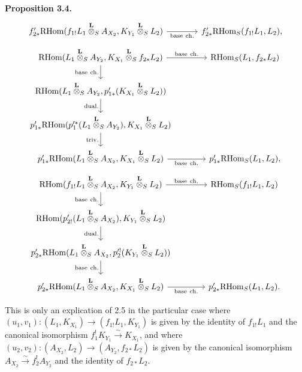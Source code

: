 \documentclass[11pt]{article}
\newenvironment{statement}[1]{\par\medskip\noindent\textbf{#1.}\ }{\par\medskip}
\providecommand{\RHom}{\mathrm{RHom}}
\begin{document}
\begin{statement}{Proposition 3.4}
\[\begin{tikzcd}[column sep=3.7em,row sep=1.7em]
f'_{2*}\RHom(f_{1!}L_1\overset{\mathbf L}{\otimes}_S A_{X_2},K_{Y_1}\overset{\mathbf L}{\otimes}_S L_2) \arrow[r,"\mathrm{base\ ch.}"']
& f'_{2*}\RHom_S(f_{1!}L_1,L_2),
\end{tikzcd}
\]
\[
\begin{tikzcd}[column sep=3.7em,row sep=1.7em]
\RHom(L_1\overset{\mathbf L}{\otimes}_S A_{Y_2},K_{X_1}\overset{\mathbf L}{\otimes}_S f_{2*}L_2)
  \arrow[r,"\mathrm{base\ ch.}"] \arrow[d,"\mathrm{base\ ch.}"']
& \RHom_S(L_1,f_{2*}L_2)  \\
\RHom(L_1\overset{\mathbf L}{\otimes}_S A_{Y_2},p'_{1*}(K_{X_1}\overset{\mathbf L}{\otimes}_S L_2)) \arrow[d,"\mathrm{dual.}"']
& \\
p'_{1*}\RHom(p_1'^*(L_1\overset{\mathbf L}{\otimes}_S A_{Y_2}),K_{X_1}\overset{\mathbf L}{\otimes}_S L_2) \arrow[d,"\mathrm{triv.}"']
& \\
p'_{1*}\RHom(L_1\overset{\mathbf L}{\otimes}_S A_{X_2},K_{X_1}\overset{\mathbf L}{\otimes}_S L_2) \arrow[r,"\mathrm{base\ ch.}"']
& p'_{1*}\RHom_S(L_1,L_2),
\end{tikzcd}
\]
\[
\begin{tikzcd}[column sep=3.7em,row sep=1.7em]
\RHom(f_{1!}L_1\overset{\mathbf L}{\otimes}_S A_{X_2},K_{Y_1}\overset{\mathbf L}{\otimes}_S L_2)
  \arrow[r,"\mathrm{base\ ch.}"] \arrow[d,"\mathrm{base\ ch.}"']
& \RHom_S(f_{1!}L_1,L_2)  \\
\RHom(p'_{2!}(L_1\overset{\mathbf L}{\otimes}_S A_{X_2}),K_{Y_1}\overset{\mathbf L}{\otimes}_S L_2) \arrow[d,"\mathrm{dual.}"']
& \\
p'_{2*}\RHom(L_1\overset{\mathbf L}{\otimes}_S A_{X_2},p_2'^!(K_{Y_1}\overset{\mathbf L}{\otimes}_S L_2)) \arrow[d,"\mathrm{base\ ch.}"']
& \\
p'_{2*}\RHom(L_1\overset{\mathbf L}{\otimes}_S A_{X_2},K_{X_1}\overset{\mathbf L}{\otimes}_S L_2) \arrow[r,"\mathrm{base\ ch.}"']
& p'_{2*}\RHom_S(L_1,L_2).
\end{tikzcd}
\]
\end{statement}
This is only an explication of 2.5 in the particular case where $(u_1,v_1):(L_1,K_{X_1})\to(f_{1!}L_1,K_{Y_1})$ is given by the identity of $f_{1!}L_1$ and the canonical isomorphism $f_1^!K_{Y_1}\xrightarrow{\sim}K_{X_1}$, and where $(u_2,v_2):(A_{X_2},L_2)\to(A_{Y_2},f_{2*}L_2)$ is given by the canonical isomorphism $A_{X_2}\xrightarrow{\sim}f_2^!A_{Y_2}$ and the identity of $f_{2*}L_2$.
\end{document}
